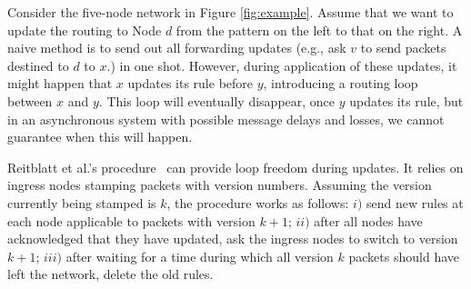 Consider the five-node network in Figure \ref{fig:example}. Assume that we want to update the routing to Node $d$ from the pattern on the left to that on the right. A naive method is to send out all forwarding updates (e.g., ask $v$ to send packets destined to $d$ to $x$.) in one shot. However, during application of these updates, it might happen that $x$ updates its rule before $y$, introducing a routing loop between $x$ and $y$. This loop will eventually disappear, once $y$ updates its rule, but in an asynchronous system with possible message delays and losses, we cannot guarantee when this will happen.


Reitblatt et al.'s procedure~\cite{safeupdate} can provide loop freedom during updates. It  relies on ingress nodes stamping packets with version numbers. Assuming the version currently being stamped is $k$, the procedure works as follows: $i)$ send new rules at each node applicable to packets with version $k+1$; $ii)$ after all nodes have acknowledged that they have updated, ask the ingress nodes to switch to version $k+1$; $iii)$ after waiting for a time during which all version $k$ packets should have left the network, delete the old rules.


